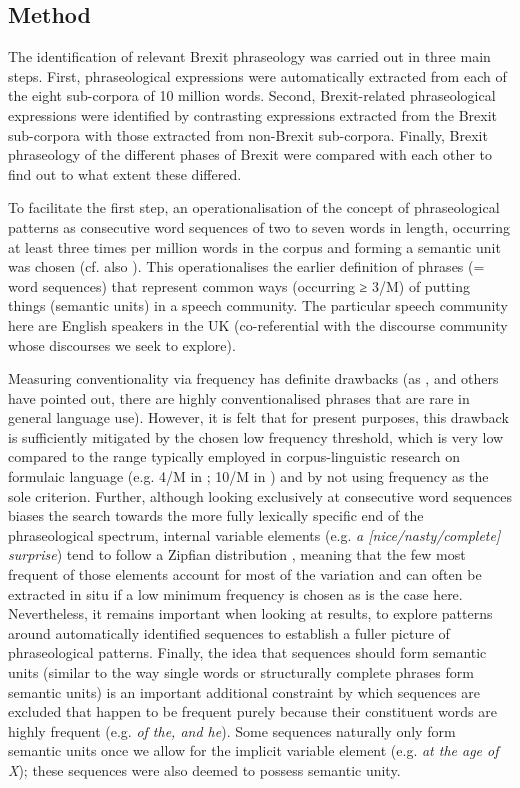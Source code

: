 \documentclass[output=paper]{langscibook}
\begin{document}
\subsection{Method}

The identification of relevant Brexit phraseology was carried out in three main steps. First, phraseological expressions were automatically extracted from each of the eight sub-corpora of 10 million words. Second, Brexit-related phraseological expressions were identified by contrasting expressions extracted from the Brexit sub-corpora with those extracted from non-Brexit sub-corpora. Finally, Brexit phraseology of the different phases of Brexit were compared with each other to find out to what extent these differed.

To facilitate the first step, an operationalisation of the concept of phraseological patterns as consecutive word sequences of two to seven words in length, occurring at least three times per million words in the corpus and forming a semantic unit was chosen (cf. also \citealt[ch.~3]{Buerki2020}). This operationalises the earlier definition of phrases (= word sequences) that represent common ways (occurring ≥ 3/M) of putting things (semantic units) in a speech community. The particular speech community here are English speakers in the UK (co-referential with the discourse community whose discourses we seek to explore). 

Measuring conventionality via frequency has definite drawbacks (as \citealt[31]{Wray2002}, and others have pointed out, there are highly conventionalised phrases that are rare in general language use). However, it is felt that for present purposes, this drawback is sufficiently mitigated by the chosen low frequency threshold, which is very low compared to the range typically employed in corpus-linguistic research on formulaic language (e.g. 4/M in \citealt[12]{McCarthyCarter2002}; 10/M in \citealt{BiberEtAl1999}) and by not using frequency as the sole criterion. Further, although looking exclusively at consecutive word sequences biases the search towards the more fully lexically specific end of the phraseological spectrum, internal variable elements (e.g. \textit{a [nice\slash nasty\slash complete] surprise}) tend to follow a Zipfian distribution \citep[35]{Ellis2012}, meaning that the few most frequent of those elements account for most of the variation and can often be extracted in situ if a low minimum frequency is chosen as is the case here. Nevertheless, it remains important when looking at results, to explore patterns around automatically identified sequences to establish a fuller picture of phraseological patterns. Finally, the idea that sequences should form semantic units (similar to the way single words or structurally complete phrases form semantic units) is an important additional constraint by which sequences are excluded that happen to be frequent purely because their constituent words are highly frequent (e.g. \textit{of the, and he}). Some sequences naturally only form semantic units once we allow for the implicit variable element (e.g. \textit{at the age of X}); these sequences were also deemed to possess semantic unity.
\end{document}
